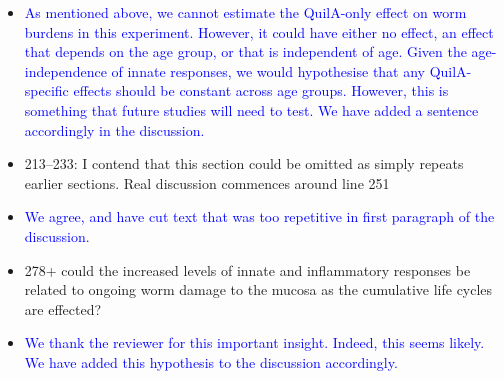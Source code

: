 \documentclass[a4paper, hidelinks, 11pt]{article}
\begin{document}
\begin{itemize}
        \item[\rightarrow] \textcolor{blue}{As mentioned above, we cannot estimate the QuilA-only effect on worm burdens in this experiment. However, it could have either no effect, an effect that depends on the age group, or that is independent of age. Given the age-independence of innate responses, we would hypothesise that any QuilA-specific effects should be constant across age groups. However, this is something that future studies will need to test. We have added a sentence accordingly in the discussion.}
        \item 213--233: I contend that this section could be omitted as simply repeats earlier sections. Real discussion commences around line 251
        \item[\rightarrow] \textcolor{blue}{We agree, and have cut text that was too repetitive in first paragraph of the discussion.}
        \item 278+ could the increased levels of innate and inflammatory responses be related to ongoing worm damage to the mucosa as the cumulative life cycles are effected?
        \item[\rightarrow] \textcolor{blue}{We thank the reviewer for this important insight. Indeed, this seems likely. We have added this hypothesis to the discussion accordingly.}
\end{itemize}


\end{document}
